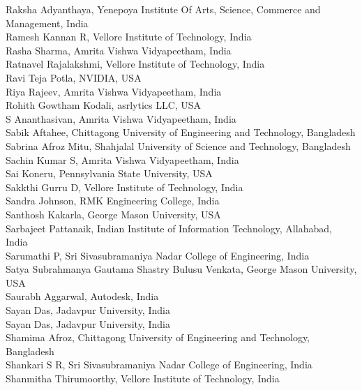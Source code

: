 \documentclass[11pt,oneside]{book}
\begin{document}
\begin{description}
          Raksha Adyanthaya, Yenepoya Institute Of Arts, Science, Commerce and Management, India\\
          Ramesh Kannan R, Vellore Institute of Technology, India\\
          Rasha Sharma, Amrita Vishwa Vidyapeetham, India\\
          Ratnavel Rajalakshmi, Vellore Institute of Technology, India\\
          Ravi Teja Potla, NVIDIA, USA\\
          Riya Rajeev, Amrita Vishwa Vidyapeetham, India\\
          Rohith Gowtham Kodali, asrlytics LLC, USA\\
          S Ananthasivan, Amrita Vishwa Vidyapeetham, India\\
          Sabik Aftahee, Chittagong University of Engineering and Technology, Bangladesh\\
          Sabrina Afroz Mitu, Shahjalal University of Science and Technology, Bangladesh\\
          Sachin Kumar S, Amrita Vishwa Vidyapeetham, India\\
          Sai Koneru, Pennsylvania State University, USA\\
          Sakkthi Gurru D, Vellore Institute of Technology, India\\
          Sandra Johnson, RMK Engineering College, India\\
          Santhosh Kakarla, George Mason University, USA\\
          Sarbajeet Pattanaik, Indian Institute of Information Technology, Allahabad, India\\
          Sarumathi P, Sri Sivasubramaniya Nadar College of Engineering, India\\
          Satya Subrahmanya Gautama Shastry Bulusu Venkata, George Mason University, USA\\
          Saurabh Aggarwal, Autodesk, India\\
          Sayan Das, Jadavpur University, India\\
          Sayan Das, Jadavpur University, India\\
          Shamima Afroz, Chittagong University of Engineering and Technology, Bangladesh\\
          Shankari S R, Sri Sivasubramaniya Nadar College of Engineering, India\\
          Shanmitha Thirumoorthy, Vellore Institute of Technology, India\\

\end{description}
\end{document}
